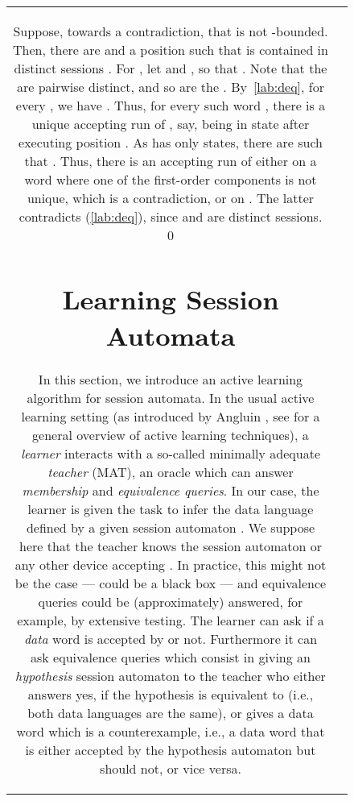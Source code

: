 \documentclass{LMCS}
\begin{document}
\begin{figure}[t]
\begin{tabular}{cc}
Suppose, towards a contradiction, that  is not
-bounded. Then, there are  and a position  such that  is contained in  distinct sessions
. For , let  and , so that . Note that the  are pairwise distinct,
and so are the . By~\eqref{lab:deq}, for every , we have . Thus, for every such word , there is a
unique accepting run of , say, being in state  after
executing position . As  has only  states, there
are  such that . Thus, there is an accepting
run of  either on a word where one of the first-order
components is not unique, which is a contradiction, or on . The latter contradicts (\ref{lab:deq}),
since  and  are distinct sessions. \qed



\section{Learning Session Automata}
\label{sec:learning}

In this section, we introduce an active learning algorithm for session
automata. In the usual active learning setting (as introduced by
Angluin \cite{Angluin:regset}, see \cite{Hig10} for a general overview
of active learning techniques), a \emph{learner} interacts with a
so-called minimally adequate \emph{teacher} (MAT), an oracle which can
answer \emph{membership} and \emph{equivalence queries}.  In our case,
the learner is given the task to infer the data language 
defined by a given session automaton .  We suppose here that the
teacher knows the session automaton or any other device accepting . In practice, this might not be the case ---  could be a
black box --- and equivalence queries could be (approximately)
answered, for example, by extensive testing.  The learner can ask if a
\emph{data} word is accepted by  or not.  Furthermore it can ask
equivalence queries which consist in giving an \emph{hypothesis}
session automaton to the teacher who either answers yes, if the
hypothesis is equivalent to  (i.e., both data languages are the
same), or gives a data word which is a counterexample, i.e., a data
word that is either accepted by the hypothesis automaton but should
not, or vice versa.


\end{tabular}
\end{figure}
\end{document}
